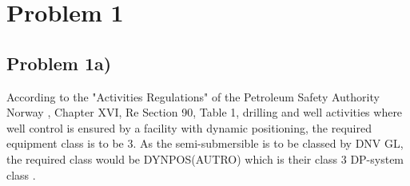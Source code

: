 \newpage
\section{Problem 1}

\subsection{Problem 1a)} \label{problem_1a}


According to the "Activities Regulations" of the Petroleum Safety Authority Norway \cite{Petroleum_Authority}, Chapter XVI, Re Section 90, Table 1, drilling and well activities where well control is ensured by a facility with dynamic positioning, the required equipment class is to be 3. As the semi-submersible is to be classed by DNV GL, the required class would be DYNPOS(AUTRO) which is their class 3 DP-system class \cite{RulesShipsDNVGLPart6Chap3}. %

\begin{comment}

\cite{Petroleum_Authority}

Chapter XVI - Maritime Operations
Section 90 - Positioning
Table 1 Equipment Class

d) Drilling and well activities: Where well control is ensured by a facility with dynamic positioning: Class 3

The equipment class is described in the IMO/MSC Circular 645, Chapter 2, Equipment Classes.

2.9 Functional requirements
In order to meet the single failure criteria it will normally be necessary to provide:
1) For equipment class 2 - redundancy of all active components.

2) For equipment class 3 - redundancy of all components and physical separation of the components.
\end{comment}
